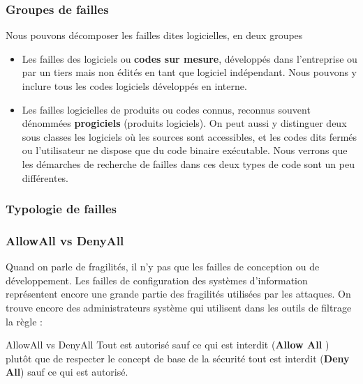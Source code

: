 \begin{frame}
\frametitle<presentation>{Groupes de failles}
Nous pouvons décomposer les failles dites logicielles, en deux groupes 
\begin{itemize}
\item Les failles des logiciels ou \textbf{codes sur mesure}, développés dans l'entreprise ou par un tiers mais non édités en tant que logiciel indépendant. Nous pouvons y inclure tous les codes logiciels développés en interne.
\item Les failles logicielles de produits ou codes connus, reconnus souvent dénommées \textbf{progiciels} (produits logiciels). On peut aussi y distinguer deux sous classes les logiciels où les sources sont accessibles, et les codes dits fermés ou l'utilisateur ne dispose que du code binaire exécutable. Nous verrons que les démarches de recherche de failles dans ces deux types de code sont un peu différentes.
\end{itemize}

\end{frame}


\begin{frame}
\frametitle<presentation>{Typologie de failles}
\end{frame}

\begin{frame}
\frametitle<presentation>{AllowAll vs DenyAll}
Quand on parle de fragilités, il n'y pas que les failles de conception ou de développement. Les failles de configuration des systèmes d'information représentent encore une grande partie des fragilités utilisées par les attaques.
On trouve encore des administrateurs système qui utilisent dans les outils de filtrage la règle :

\begin{notebox}{AllowAll vs DenyAll}
Tout est autorisé sauf ce qui est interdit (\textbf{Allow All })
plutôt que de respecter le concept de base de la sécurité 
tout est interdit (\textbf{Deny All}) sauf ce qui est autorisé.
\end{notebox}

\end{frame}


